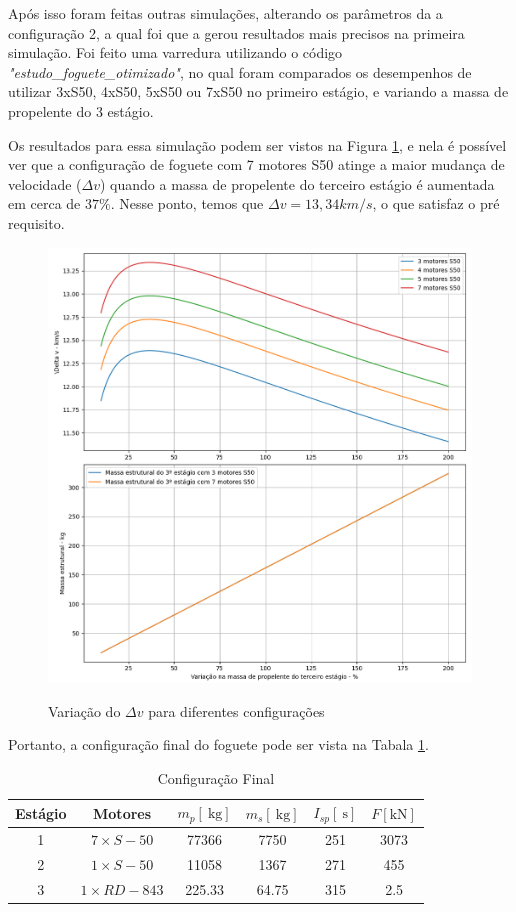 Após isso foram feitas outras simulações, alterando os parâmetros da a configuração 2, a qual foi que a gerou resultados mais precisos na primeira simulação. Foi feito uma varredura utilizando o código \textit{"estudo\_foguete\_otimizado"}, no qual foram comparados os desempenhos de utilizar 3xS50, 4xS50, 5xS50 ou 7xS50 no primeiro estágio, e variando a massa de propelente do 3 estágio. 

Os resultados para essa simulação podem ser vistos na Figura \ref{fig:motores}, e nela é possível ver que a configuração de foguete com 7 motores S50 atinge a maior mudança de velocidade ($\Delta v$) quando a massa de propelente do terceiro estágio é aumentada em cerca de $37\%$. Nesse ponto, temos que $\Delta v = 13,34 km/s$, o que satisfaz o pré requisito.

\begin{figure}[H]
    \begin{center}
        \caption{Variação do $\Delta v$ para diferentes configurações}
        \includegraphics[width=4.5in]{figuras/motores.png}
        \label{fig:motores}
     \end{center}
\end{figure}

Portanto, a configuração final do foguete pode ser vista na Tabala \ref{tab:final}.

\begin{table}[h]
\centering
\caption{Configuração Final} 
\label{tab:final}
\begin{tabular}{cccccc}
\hline
Estágio & Motores & $m_{p}[\mathrm{~kg}]$ & $m_{s}[\mathrm{~kg}]$ & $I_{s p}[\mathrm{~s}]$ & $F[\mathrm{kN}]$ \\
\hline
1 & $7 \times S-50$ & 77366 & 7750 & 251 & 3073 \\
2 & $1 \times S-50$ & 11058 & 1367 & 271 & 455 \\
3 & $1 \times R D-843$ & 225.33 & 64.75 & 315 & 2.5 \\
\hline
\end{tabular}

\end{table}


